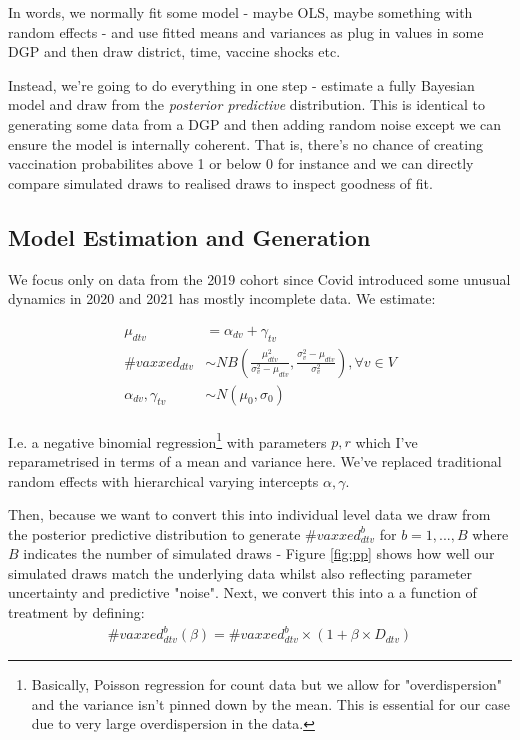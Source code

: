 \documentclass{article}
\begin{document}
In words, we normally fit some model - maybe OLS, maybe something with random 
effects - and use fitted means and variances as plug in values in some DGP and then draw 
district, time, vaccine shocks etc.
    


Instead, we're going to do everything in one step - estimate a fully Bayesian model 
and draw from the \textit{posterior predictive} distribution. This is identical to 
generating some data from a DGP and then adding random noise except we can ensure 
the model is internally coherent. That is, there's no chance of creating vaccination 
probabilites above 1 or below 0 for instance and we can directly compare simulated 
draws to realised draws to inspect goodness of fit.


\subsection*{Model Estimation and Generation}


We focus only on data from the 2019 cohort since Covid introduced some unusual  
dynamics in 2020 and 2021 has mostly incomplete data. We estimate:

\begin{align*}
     \mu_{dtv} &= \alpha_{dv} + \gamma_{tv} \\
     \# \textit{vaxxed}_{dtv} &\sim NB\left(\frac{\mu_{dtv}^2}{\sigma^2_{v} - \mu_{dtv}}, \frac{\sigma^2_{v} - \mu_{dtv}}{\sigma^2_{v}} \right), \forall v \in V \\
     \alpha_{dv}, \gamma_{tv} &\sim N(\mu_0, \sigma_0) \\
\end{align*}

I.e. a negative binomial regression\footnote{Basically, Poisson regression for count data but 
we allow for "overdispersion" and the variance isn't pinned down by the mean. This is essential for our case 
due to very large overdispersion in the data.} with 
parameters $p, r$ which I've reparametrised in terms of a mean and variance here. 
We've replaced traditional random effects with hierarchical varying intercepts $\alpha, \gamma$.



Then, because we want to convert this into individual level data we draw from the 
posterior predictive distribution to generate $\# vaxxed_{dtv}^b$ for $b = 1, ..., B$ 
where $B$ indicates the number of simulated draws - Figure \ref{fig:pp} shows how 
well our simulated draws match the underlying data whilst also reflecting parameter 
uncertainty and predictive "noise".  Next, we convert this into a 
a function of treatment by defining: 
\begin{align*}
    \# vaxxed_{dtv}^b(\beta) = \# vaxxed_{dtv}^b \times (1 + \beta \times D_{dtv}) 
\end{align*}
\end{document}
